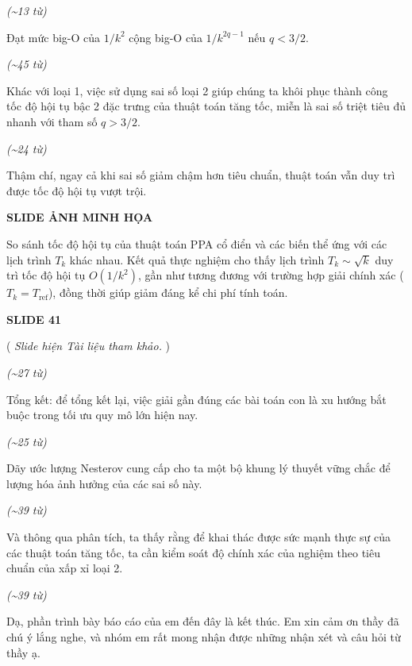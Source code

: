 ﻿\documentclass[12pt]{article}
\newcommand{\scene}[1]{
    \vspace{18pt}
    \normalsize
    \noindent\textbf{\MakeUppercase{#1}}
    \vspace{12pt}
}
\newcommand{\action}[1]{
    \vspace{6pt}
    \small
    \noindent(\textit{#1})
    \vspace{6pt}
}
\newenvironment{speech}{
    \normalsize
    \begin{list}{}{
        \leftmargin=1.25in
        \rightmargin=1.25in
        \parsep=0pt
        \topsep=0pt
        \partopsep=0pt
    }
    \item[]
}{
    \end{list}
    \vspace{6pt}
}
\newcommand{\block}[1]{
    \vspace{4pt}
    \noindent\hspace{1.5in}\textit{(\textasciitilde #1 từ)}
}
\begin{document}
\block{13}
\begin{speech}
    Đạt mức big-O của $1/k^2$ cộng big-O của $1/k^{2q-1}$ nếu $q < 3/2$.
\end{speech}

\block{45}
\begin{speech}
    Khác với loại 1, việc sử dụng sai số loại 2 giúp chúng ta khôi phục thành công tốc độ hội tụ bậc 2 đặc trưng của thuật toán tăng tốc, miễn là sai số triệt tiêu đủ nhanh với tham số $q > 3/2$.
\end{speech}

\block{24}
\begin{speech}
    Thậm chí, ngay cả khi sai số giảm chậm hơn tiêu chuẩn, thuật toán vẫn duy trì được tốc độ hội tụ vượt trội.
\end{speech}

\scene{Slide ảnh minh họa}
\begin{speech}
    So sánh tốc độ hội tụ của thuật toán PPA cổ điển và các biến thể ứng với các lịch trình \(T_k\) khác nhau. Kết quả thực nghiệm cho thấy lịch trình \(T_k \sim \sqrt{k}\) duy trì tốc độ hội tụ \(O(1/k^2)\), gần như tương đương với trường hợp giải chính xác (\(T_k = T_{\mathrm{ref}}\)), đồng thời giúp giảm đáng kể chi phí tính toán.
\end{speech}

\scene{SLIDE 41}

\action{
    Slide hiện Tài liệu tham khảo.
}

\block{27}
\begin{speech}
    Tổng kết: để tổng kết lại, việc giải gần đúng các bài toán con là xu hướng bắt buộc trong tối ưu quy mô lớn hiện nay.
\end{speech}

\block{25}
\begin{speech}
    Dãy ước lượng Nesterov cung cấp cho ta một bộ khung lý thuyết vững chắc để lượng hóa ảnh hưởng của các sai số này.
\end{speech}

\block{39}
\begin{speech}
    Và thông qua phân tích, ta thấy rằng để khai thác được sức mạnh thực sự của các thuật toán tăng tốc, ta cần kiểm soát độ chính xác của nghiệm theo tiêu chuẩn của xấp xỉ loại 2.
\end{speech}

\block{39}
\begin{speech}
    Dạ, phần trình bày báo cáo của em đến đây là kết thúc. Em xin cảm ơn thầy đã chú ý lắng nghe, và nhóm em rất mong nhận được những nhận xét và câu hỏi từ thầy ạ.
\end{speech}
\end{document}
